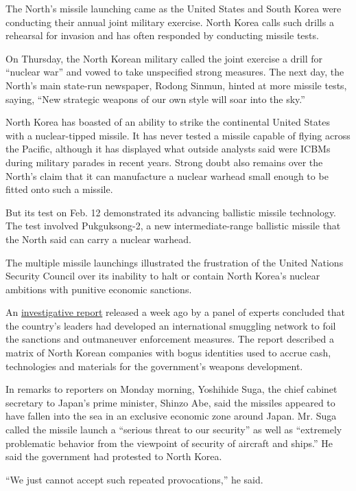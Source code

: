 The North's missile launching came as the United States and South Korea
were conducting their annual joint military exercise. North Korea calls
such drills a rehearsal for invasion and has often responded by
conducting missile tests.

On Thursday, the North Korean military called the joint exercise a drill
for ``nuclear war'' and vowed to take unspecified strong measures. The
next day, the North's main state-run newspaper, Rodong Sinmun, hinted at
more missile tests, saying, ``New strategic weapons of our own style
will soar into the sky.''

North Korea has boasted of an ability to strike the continental United
States with a nuclear-tipped missile. It has never tested a missile
capable of flying across the Pacific, although it has displayed what
outside analysts said were ICBMs during military parades in recent
years. Strong doubt also remains over the North's claim that it can
manufacture a nuclear warhead small enough to be fitted onto such a
missile.

But its test on Feb. 12 demonstrated its advancing ballistic missile
technology. The test involved Pukguksong-2, a new intermediate-range
ballistic missile that the North said can carry a nuclear warhead.

The multiple missile launchings illustrated the frustration of the
United Nations Security Council over its inability to halt or contain
North Korea's nuclear ambitions with punitive economic sanctions.

An
\href{https://assets.documentcloud.org/documents/3482392/NORTH-KOREA-REPORT.pdf}{investigative
report} released a week ago by a panel of experts concluded that the
country's leaders had developed an international smuggling network to
foil the sanctions and outmaneuver enforcement measures. The report
described a matrix of North Korean companies with bogus identities used
to accrue cash, technologies and materials for the government's weapons
development.

In remarks to reporters on Monday morning, Yoshihide Suga, the chief
cabinet secretary to Japan's prime minister, Shinzo Abe, said the
missiles appeared to have fallen into the sea in an exclusive economic
zone around Japan. Mr. Suga called the missile launch a ``serious threat
to our security'' as well as ``extremely problematic behavior from the
viewpoint of security of aircraft and ships.'' He said the government
had protested to North Korea.

``We just cannot accept such repeated provocations,'' he said.

